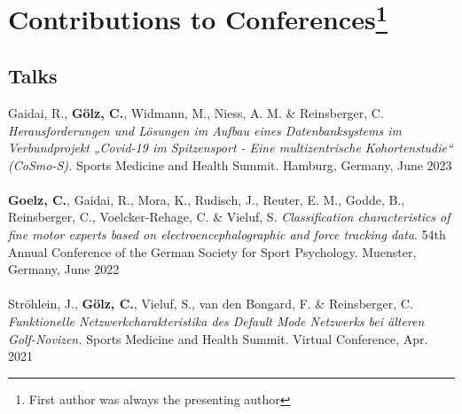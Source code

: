 
\section*{Contributions to Conferences\footnote{First author was always the presenting author}}
\subsection*{Talks}
Gaidai, R., \textbf{Gölz, C.}, Widmann, M., Niess, A. M. \& Reinsberger, C. \textit{Herausforderungen und Lösungen im Aufbau eines Datenbanksystems im Verbundprojekt „Covid-19 im Spitzensport - Eine multizentrische Kohortenstudie“ (CoSmo-S).} Sports Medicine and Health Summit. Hamburg, Germany, June 2023\\
\\
\textbf{Goelz, C.}, Gaidai, R., Mora, K., Rudisch, J., Reuter, E. M., Godde, B., Reinsberger, C., Voelcker-Rehage, C. \& Vieluf, S. \textit{Classification characteristics of fine motor experts based on electroencephalographic and force tracking data}. 54th Annual Conference of the German Society for Sport Psychology. Muenster, Germany, June 2022\\
\\
Ströhlein, J., \textbf{Gölz, C.}, Vieluf, S., van den Bongard, F. \& Reinsberger, C.\textit{ Funktionelle Netzwerkcharakteristika des Default Mode Netzwerks bei älteren Golf-Novizen.} Sports Medicine and Health Summit. Virtual Conference, Apr. 2021\\
